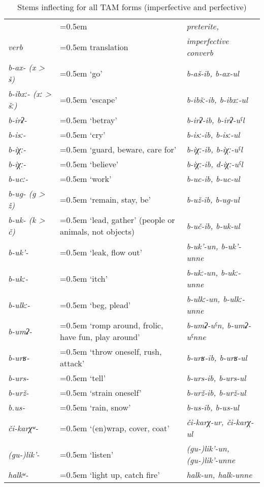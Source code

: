 \begin{table}
	\caption{Stems inflecting for all TAM forms (imperfective and perfective)}
	\label{tab:Stems inflecting for all TAM forms (imperfective and perfective)}
	\small
	\begin{tabularx}{0.98\textwidth}[]{%
		>{\raggedright\arraybackslash\itshape}p{70pt}
		>{\raggedright\arraybackslash\hangindent=0.5em}X
		>{\raggedright\arraybackslash\itshape}X}
		
		\lsptoprule
			{}
		&	{}
		&	\upshape preterite,\\
			\upshape verb
		&	\upshape translation
		&	\upshape imperfective converb\\
		\midrule
			b-ax- (x > š) 	&	`go'				&	b-aš-ib, b-ax-ul\\
			b-ibxː- (xː > šː)	&	`escape'			&	b-ibšː-ib, b-ibxː-ul\\
			b-irʡ-			&	`betray'			&	b-irʡ-ib, b-irʡ-uˁl\\
			b-isː-			&	`cry' 				&	b-isː-ib, b-isː-ul\\
			b-iχː-			&	`guard, beware, care for'	&	b-iχː-ib, b-iχː-uˁl\\
			b-iχː-			&	`believe'			&	b-iχː-ib, d-iχː-uˁl\\
			b-ucː-			&	`work'				&	b-uc-ib, b-uc-ul\\
			b-ug- (g > ž)		&	`remain, stay, be'		&	b-už-ib, b-ug-ul\\
			b-uk- (k > č)		&	`lead, gather' (people or animals, not objects)	&	b-uč-ib, b-uk-ul\\
			b-uk'-			&	`leak, flow out'		&	b-uk'-un, b-uk'-unne\\
			b-ukː-			&	`itch'				&	b-ukː-un, b-ukː-unne\\
			b-ulkː-			&	`beg, plead'			&	b-ulkː-un, b-ulkː-unne\\
			b-umʡ-		&	`romp around, frolic, have fun, play around'	&	b-umʡ-uˁn, b-umʡ-uˁnne\\
			b-urʁ-			&	`throw oneself, rush, attack' &	b-urʁ-ib, b-urʁ-ul\\
			b-urs- 		&	`tell'				&	b-urs-ib, b-urs-ul\\
			b-urž-			&	`strain oneself'		&	b-urž-ib, b-urž-ul\\
			b.us-			&	`rain, snow'			&	b-us-ib, b-us-ul\\
			či-karχʷ-		&	`(en)wrap, cover, coat'	&	či-karχ-ur, či-karχ-ul\\
			(gu-)lik'-		&	`listen'				&	(gu-)lik'-un, (gu-)lik'-unne\\
			halkʷ-			&	`light up, catch fire'		&	halk-un, halk-unne\\

\end{tabularx}
\end{table}
